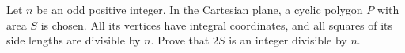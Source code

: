 Let $n$ be an odd positive integer. In the Cartesian plane, a cyclic polygon $P$ with area $S$ is chosen. All its vertices have integral coordinates, and all squares of its side lengths are divisible by $n$. Prove that $2S$ is an integer divisible by $n$.
